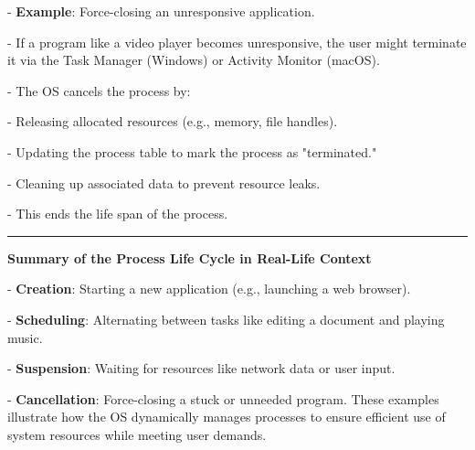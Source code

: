 \documentclass[a4paper]{book}
\begin{document}
   - \textbf{Example}: Force-closing an unresponsive application.
     
     - If a program like a video player becomes unresponsive, the user might terminate it via the Task Manager (Windows) or Activity Monitor (macOS).
       
       - The OS cancels the process by:
         
         - Releasing allocated resources (e.g., memory, file handles).
         
         - Updating the process table to mark the process as "terminated."
         
         - Cleaning up associated data to prevent resource leaks.
     
     - This ends the life span of the process.

\rule{0.75\textwidth}{0.5pt}

\textbf{Summary of the Process Life Cycle in Real-Life Context}

- \textbf{Creation}: Starting a new application (e.g., launching a web browser).

- \textbf{Scheduling}: Alternating between tasks like editing a document and playing music.

- \textbf{Suspension}: Waiting for resources like network data or user input.

- \textbf{Cancellation}: Force-closing a stuck or unneeded program.
These examples illustrate how the OS dynamically manages processes to ensure efficient use of system resources while meeting user demands.
\end{document}
